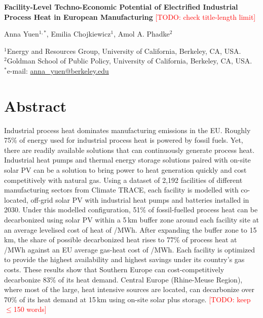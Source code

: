 \documentclass[11pt]{article}
\newcommand{\todo}[1]{\textcolor{red}{[TODO: #1]}}
\begin{document}
\begin{flushleft}
{\Large\bfseries Facility-Level Techno-Economic Potential of Electrified Industrial Process Heat in European Manufacturing}
\todo{check title-length limit}

\bigskip
Anna Yuen$^{1,*}$, Emilia Chojkiewicz$^{1}$, Amol A. Phadke$^{2}$

\medskip
\small
$^{1}$Energy and Resources Group, University of California, Berkeley, CA, USA.\\
$^{2}$Goldman School of Public Policy, University of California, Berkeley, CA, USA.\\
$^{*}$e-mail: \href{mailto:anna_yuen@berkeley.edu}{anna\_yuen@berkeley.edu}
\end{flushleft}

\section*{Abstract}
Industrial process heat dominates manufacturing emissions in the EU. Roughly 75\% of energy used for industrial process heat is powered by fossil fuels. Yet, there are readily available solutions that can continuously generate process heat. Industrial heat pumps and thermal energy storage solutions paired with on-site solar PV can be a solution to bring power to heat generation quickly and cost competitively with natural gas. Using a dataset of 2,192 facilities of different manufacturing sectors from Climate TRACE, each facility is modelled with co-located, off-grid solar PV with industrial heat pumps and batteries installed in 2030. Under this modelled configuration, 51\% of fossil-fuelled process heat can be decarbonized using solar PV within a 5\,km buffer zone around each facility site at an average levelised cost of heat of /MWh. After expanding the buffer zone to 15\,km, the share of possible decarbonized heat rises to 77\% of process heat at /MWh against an EU average gas-heat cost of /MWh. Each facility is optimized to provide the highest availability and highest savings under its country's gas costs. These results show that Southern Europe can cost-competitively decarbonize 83\% of its heat demand. Central Europe (Rhine-Meuse Region), where most of the large, heat intensive sources are located, can decarbonize over 70\% of its heat demand at 15\,km using on-site solar plus storage.
\todo{keep $\le$150 words}
\end{document}
